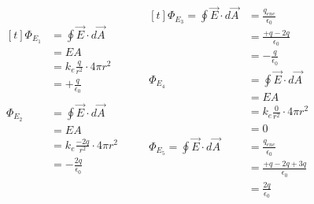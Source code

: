 \documentclass[11pt]{article}
\begin{document}
\begin{align*}
\begin{aligned}[t]
\Phi_{E_1} &= \oint \vec{E} \cdot d\vec{A} \\
          &= EA \\
          &= k_e \frac{q}{r^2} \cdot 4 \pi r^{2} \\
          &= + \frac{q}{\epsilon_{0}} \\
\\
\Phi_{E_2} &= \oint \vec{E} \cdot d\vec{A} \\
           &= EA \\
           &= k_e \frac{-2q}{r^2} \cdot 4 \pi r^{2} \\
           &= - \frac{2q}{\epsilon_{0}} \\
\end{aligned}
\qquad
\begin{aligned}[t]
\Phi_{E_3} = \oint \vec{E} \cdot d\vec{A} &= \frac{q_{enc}}{\epsilon_0} \\
&= \frac{+q -2q}{\epsilon_0} \\
&= -\frac{q}{\epsilon_0}
\\
\Phi_{E_4} &= \oint \vec{E} \cdot d\vec{A} \\
           &= EA \\
           &= k_e \frac{0}{r^2} \cdot 4 \pi r^{2} \\
           &= 0
\\
\Phi_{E_5} = \oint \vec{E} \cdot d\vec{A} &= \frac{q_{enc}}{\epsilon_0} \\
&= \frac{+q -2q + 3q}{\epsilon_0} \\
&= \frac{2q}{\epsilon_0}
\end{aligned}
\end{align*}
\end{document}
